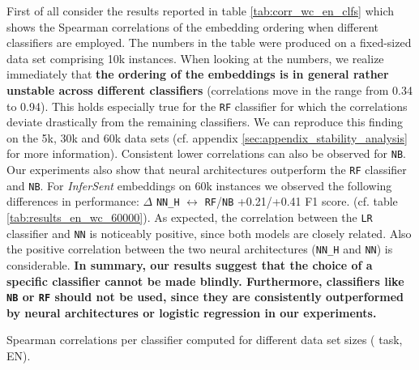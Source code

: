

First of all consider the results reported in table \vref{tab:corr_wc_en_clfs} which shows the Spearman correlations of the embedding ordering when different classifiers are employed. The numbers in the table were produced on a fixed-sized data set comprising 10k instances. When looking at the numbers, we realize immediately that \textbf{the ordering of the embeddings is in general rather unstable across different classifiers} (correlations move in the range from 0.34 to 0.94). This holds especially true for the \texttt{RF} classifier for which the correlations deviate drastically from the remaining classifiers. We can reproduce this finding on the 5k, 30k and 60k data sets (cf. appendix \vref{sec:appendix_stability_analysis} for more information). Consistent lower correlations can also be observed for \texttt{NB}. Our experiments also show that neural architectures outperform the \texttt{RF} classifier and \texttt{NB}. For \textit{InferSent} embeddings on 60k instances we observed the following differences in performance: $\Delta$ \texttt{NN\_H} $\leftrightarrow$ \texttt{RF}/\texttt{NB} +0.21/+0.41 F1 score. (cf. table \vref{tab:results_en_wc_60000}). As expected, the correlation between the \texttt{LR} classifier and \texttt{NN} is noticeably positive, since both models are closely related. Also the positive correlation between the two neural architectures (\texttt{NN\_H} and \texttt{NN}) is considerable. \textbf{In summary, our results suggest that the choice of a specific classifier cannot be made blindly. Furthermore, classifiers like \texttt{NB} or \texttt{RF} should not be used, since they are consistently outperformed by neural architectures or logistic regression in our experiments.}

\begin{table}[h]
	\begin{minipage}{0.32\textwidth}
		
	\end{minipage}
	\hfill
	\begin{minipage}{0.32\textwidth}
		
	\end{minipage}
	\hfill
	\begin{minipage}{0.32\textwidth}
		
	\end{minipage}

	\begin{minipage}{0.49\textwidth}
		
	\end{minipage}
	\hfill
	\begin{minipage}{0.49\textwidth}
		
	\end{minipage}
	\caption[Spearman correlations per classifier for different data set sizes ( task, EN)]
		{Spearman correlations per classifier computed for different data set sizes ( task, EN).}
	\label{tab:corr_wc_en_sizes}
\end{table}

